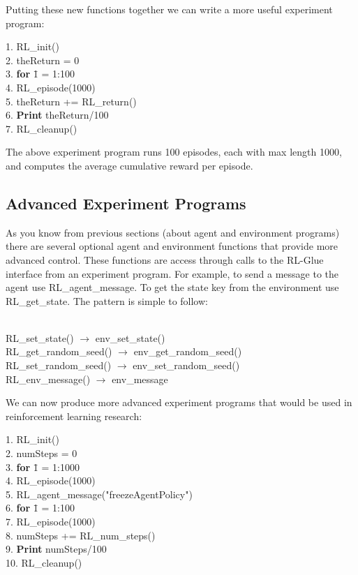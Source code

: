 \documentclass[11pt]{article}
\begin{document}
Putting these new functions together we can write a more useful experiment program:
\begin{tabbing}
1. RL\_init()\\
2. theReturn = 0\\
3. {\bf for} \= 1 = 1:100\\
4. \> RL\_episode(1000)\\
5. \> theReturn += RL\_return()\\
6.  {\bf Print} theReturn/100\\
7. RL\_cleanup()
\end{tabbing}
The above experiment program runs 100 episodes, each with max length 1000, and computes the average cumulative reward per episode.
\subsection{Advanced Experiment Programs}

As you know from previous sections (about agent and environment programs) there are several optional agent and environment functions that provide more advanced control. These functions are access through calls to the RL-Glue interface from an experiment program. For example, to send a message to the agent use RL\_agent\_message. To get the state key from the environment use RL\_get\_state. The pattern is simple to follow:\\\\

\begin{centering}
RL\_set\_state() $\rightarrow$ env\_set\_state()\\
RL\_get\_random\_seed() $\rightarrow$ env\_get\_random\_seed()\\
RL\_set\_random\_seed() $\rightarrow$ env\_set\_random\_seed()\\
RL\_env\_message() $\rightarrow$ env\_message\\
\end{centering}    
We can now produce more advanced experiment programs that would be used in reinforcement learning research:
\begin{tabbing}
1. RL\_init()\\
2. numSteps = 0\\
3. {\bf for} \= 1 = 1:1000\\
4. \> RL\_episode(1000)\\
5. RL\_agent\_message("freezeAgentPolicy")\\
6. {\bf for} \= 1 = 1:100\\
7. \> RL\_episode(1000)\\
8. \> numSteps += RL\_num\_steps()\\
9.  {\bf Print} numSteps/100\\
10. RL\_cleanup()
\end{tabbing}
\end{document}
